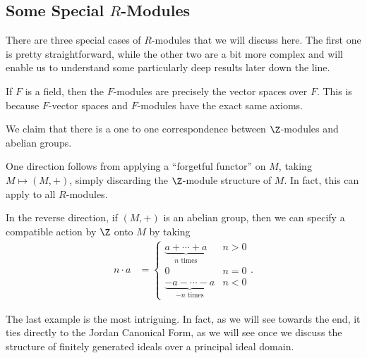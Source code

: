 \documentclass[10pt]{mypackage}
\begin{document}
\subsection{Some Special $R$-Modules}%
There are three special cases of $R$-modules that we will discuss here. The first one is pretty straightforward, while the other two are a bit more complex and will enable us to understand some particularly deep results later down the line.
\begin{example}
  If $F$ is a field, then the $F$-modules are precisely the vector spaces over $F$. This is because $F$-vector spaces and $F$-modules have the exact same axioms.
\end{example}
\begin{example}
  We claim that there is a one to one correspondence between $\Z$-modules and abelian groups.%

  One direction follows from applying a ``forgetful functor'' on $M$, taking $M\mapsto \left( M,+ \right)$, simply discarding the $\Z$-module structure of $M$. In fact, this can apply to all $R$-modules.%

  In the reverse direction, if $\left( M,+ \right)$ is an abelian group, then we can specify a compatible action by $\Z$ onto $M$ by taking
  \begin{align*}
    n\cdot a &= \begin{cases}
      \underbrace{a + \cdots + a}_{n\text{ times}} & n > 0\\
      0 & n = 0\\
      \underbrace{-a-\cdots-a}_{-n\text{ times}} & n < 0
    \end{cases}.
  \end{align*}
\end{example}
The last example is the most intriguing. In fact, as we will see towards the end, it ties directly to the Jordan Canonical Form, as we will see once we discuss the structure of finitely generated ideals over a principal ideal domain.
\end{document}
